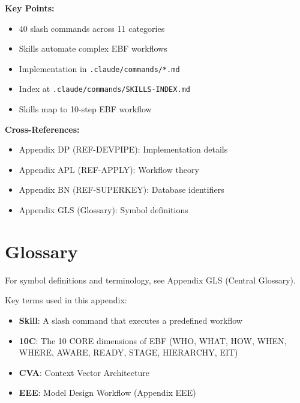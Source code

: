 \begin{tcolorbox}[colback=green!5!white, colframe=green!75!black,
    title=Summary: REF-SKILLS]

\textbf{Key Points:}
\begin{itemize}[nosep]
\item 40 slash commands across 11 categories
\item Skills automate complex EBF workflows
\item Implementation in \texttt{.claude/commands/*.md}
\item Index at \texttt{.claude/commands/SKILLS-INDEX.md}
\item Skills map to 10-step EBF workflow
\end{itemize}

\textbf{Cross-References:}
\begin{itemize}[nosep]
\item Appendix DP (REF-DEVPIPE): Implementation details
\item Appendix APL (REF-APPLY): Workflow theory
\item Appendix BN (REF-SUPERKEY): Database identifiers
\item Appendix GLS (Glossary): Symbol definitions
\end{itemize}

\end{tcolorbox}



\section{Glossary}

For symbol definitions and terminology, see Appendix GLS (Central Glossary).

Key terms used in this appendix:
\begin{itemize}
\item \textbf{Skill}: A slash command that executes a predefined workflow
\item \textbf{10C}: The 10 CORE dimensions of EBF (WHO, WHAT, HOW, WHEN, WHERE, AWARE, READY, STAGE, HIERARCHY, EIT)
\item \textbf{CVA}: Context Vector Architecture
\item \textbf{EEE}: Model Design Workflow (Appendix EEE)
\end{itemize}


